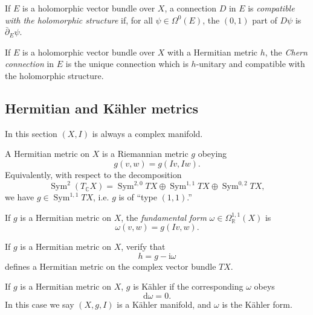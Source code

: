 \documentclass[12pt,letterpaper,reqno]{amsart}
\numberwithin{equation}{section}
\newcommand{\R}{\ensuremath{\mathbb R}}
\newcommand{\C}{\ensuremath{\mathbb C}}
\newcommand{\kahler}{K\"ahler\xspace}
\newcommand{\I}{{\mathrm i}}
\newcommand{\de}{\mathrm{d}}
\newcommand{\ti}[1]{\textit{#1}}
\DeclareMathOperator{\Sym}{Sym}
\begin{document}
\begin{defn}
If $E$ is a holomorphic vector bundle over $X$,
a connection $D$ in $E$ is \ti{compatible with the
holomorphic structure} if, for all 
$\psi \in \Omega^0(E)$, the $(0,1)$ part of $D \psi$ 
is $\bar\partial_E \psi$.
\end{defn}

\begin{defn}
If $E$ is a holomorphic vector bundle over $X$ with
a Hermitian metric $h$, the \ti{Chern connection} 
in $E$ is the unique connection which is 
$h$-unitary and compatible with the holomorphic
structure.
\end{defn}

\subsection{Hermitian and \kahler metrics}

In this section $(X,I)$ is always a complex manifold.

\begin{defn} A Hermitian metric on $X$ is a Riemannian
metric $g$ obeying
$$ g(v,w) = g(Iv,Iw). $$
Equivalently, with respect to the decomposition 
\begin{equation}
  \Sym^2 (T_\C X) = \Sym^{2,0} TX \oplus \Sym^{1,1} TX \oplus \Sym^{0,2} TX,
\end{equation}
we have $g \in \Sym^{1,1} TX$, i.e. $g$ is of ``type $(1,1)$.''
\end{defn}

\begin{defn} If $g$ is a Hermitian metric on $X$, 
the \ti{fundamental form} $\omega \in \Omega^{1,1}_\R(X)$
is
\begin{equation}
  \omega(v,w) = g(Iv,w).
\end{equation}
\end{defn}

\begin{exercise} \label{exc:hermitian-metric} 
If $g$ is a Hermitian metric on $X$,
verify that
\begin{equation}
  h = g - \I \omega
\end{equation}
defines a Hermitian metric on the complex vector
bundle $TX$.
\end{exercise}

\begin{defn}[\kahler metric] If $g$ is a Hermitian metric on $X$,
$g$ is \kahler if the corresponding $\omega$ obeys
\begin{equation}
  \de \omega = 0.
\end{equation}
In this case we say $(X,g,I)$ is a \kahler manifold,
and $\omega$ is the \kahler form.
\end{defn}
\end{document}
